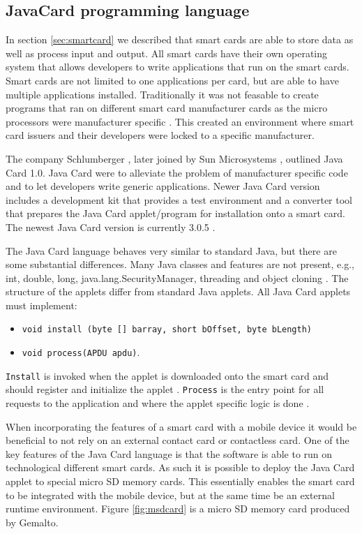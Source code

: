 \subsection{JavaCard programming language}
\label{sec:javacard}
In section \ref{sec:smartcard} we described that smart cards are able to store data as well as process input and output. All smart cards have their own operating system that allows developers to write applications that run on the smart cards. Smart cards are not limited to one applications per card, but are able to have multiple applications installed. Traditionally it was not feasable to create programs that ran on different smart card manufacturer cards as the micro processors were manufacturer specific \cite{javacardapplet}. This created an environment where smart card issuers and their developers were locked to a specific manufacturer.

The company Schlumberger \cite{schlumberger}, later joined by Sun Microsystems \cite{sunMicroSystems}, outlined Java Card 1.0. Java Card were to alleviate the problem of manufacturer specific code and to let developers write generic applications. Newer Java Card version includes a development kit that provides a test environment and a converter tool that prepares the Java Card applet/program for installation onto a smart card. The newest Java Card version is currently 3.0.5 \cite{javacard305}.

The Java Card language behaves very similar to standard Java, but there are some substantial differences. Many Java classes and features are not present, e.g., int, double, long, java.lang.SecurityManager, threading and object cloning \cite{javacardlimits}. The structure of the applets differ from standard Java applets. All Java Card applets must implement:
\begin{itemize}
    \item \texttt{void install (byte [] barray, short bOffset, byte bLength)}
    \item \texttt{void process(APDU apdu)}.
\end{itemize}
\texttt{Install} is invoked when the applet is downloaded onto the smart card and should register and initialize the applet \cite{javacardinstall}. \texttt{Process} is the entry point for all requests to the application and where the applet specific logic is done \cite{javacardprocess}.

When incorporating the features of a smart card with a mobile device it would be beneficial to not rely on an external contact card or contactless card. One of the key features of the Java Card language is that the software is able to run on technological different smart cards. As such it is possible to deploy the Java Card applet to special micro SD memory cards. This essentially enables the smart card to be integrated with the mobile device, but at the same time be an external runtime environment. Figure \ref{fig:msdcard} is a micro SD memory card produced by Gemalto.

